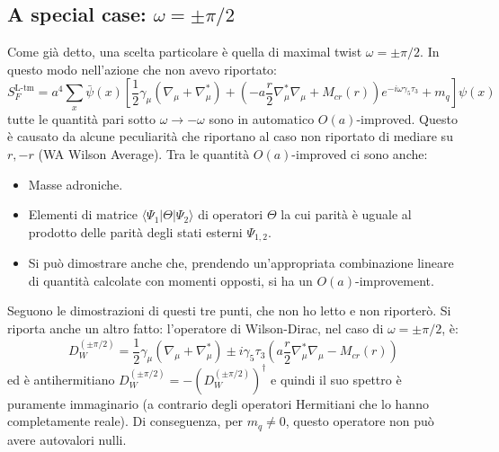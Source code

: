 \documentclass[12pt,a4paper,openright]{article}
\newcommand{\la}{\langle}
\newcommand{\ra}{\rangle}
\begin{document}
\subsection{A special case: $\omega = \pm \pi/2$}
Come già detto, una scelta particolare è quella di maximal twist $\omega = \pm \pi/2$.
In questo modo nell'azione che non avevo riportato:
\begin{equation}\label{eq:tmlqcdaction}
  S_F^{\text{L-tm}} = a^4 \sum_{ x} \bar\psi (x) \left[ \frac{1}{2}\gamma_\mu (\nabla_\mu + \nabla_\mu^*) + \left(- a\frac{r}{2}\nabla_\mu^*\nabla_\mu + M_{cr}(r)\right)e^{- i \omega \gamma_5 \tau_3} + m_q\right] \psi (x)
\end{equation}
tutte le quantità pari sotto $\omega \rightarrow -\omega$ sono in automatico $O(a)$-improved.
Questo è causato da alcune peculiarità che riportano al caso non riportato di mediare su $r, -r$ (WA Wilson Average).
Tra le quantità $O(a)$-improved ci sono anche:
\begin{itemize}
  \item Masse adroniche.
  \item Elementi di matrice $\la \Psi_1 | \Theta | \Psi_2 \ra$ di operatori $\Theta$ la cui parità è uguale al prodotto delle parità degli stati esterni $\Psi_{1,2}$.
  \item Si può dimostrare anche che, prendendo un'appropriata combinazione lineare di quantità calcolate con momenti opposti, si ha un $O(a)$-improvement.
\end{itemize}
Seguono le dimostrazioni di questi tre punti, che non ho letto e non riporterò.
\newline
Si riporta anche un altro fatto: l'operatore di Wilson-Dirac, nel caso di $\omega = \pm \pi/2$, è:
\begin{equation}\label{eq:WDoperator-Mtm}
  D_W^{(\pm \pi/2)} = \frac{1}{2}\gamma_\mu \left(\nabla_\mu + \nabla_\mu^*\right) \pm i \gamma_5 \tau_3 \left( a \frac{r}{2} \nabla_\mu^* \nabla_\mu - M_{cr}(r) \right)
\end{equation}
ed è antihermitiano $D_W^{(\pm \pi/2)} = - (D_W^{(\pm \pi/2)})^\dagger$ e quindi il suo spettro è puramente immaginario (a contrario degli operatori Hermitiani che lo hanno completamente reale).
Di conseguenza, per $m_q \ne 0$, questo operatore non può avere autovalori nulli.
\end{document}
